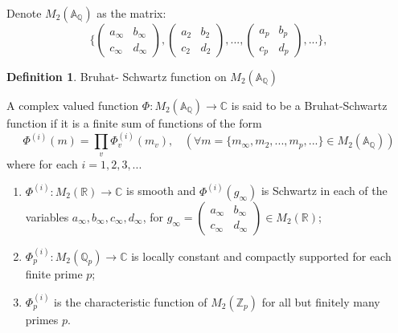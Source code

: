 \documentclass[12pt,a4paper,english]{article}
\theoremstyle{plain}
\theoremstyle{definition}
\newtheorem{defi}{Definition}
\begin{document}
Denote $M_{2}(\mathbb{A}_{\mathbb{Q}})$ as the matrix:
\begin{equation*}
    \bigg\{\begin{pmatrix}
    a_{\infty} &b_{\infty}\\
    c_{\infty} & d_{\infty}
    \end{pmatrix},
    \begin{pmatrix}
a_{2} & b_{2}\\
c_{2} & d_{2}
\end{pmatrix},...,
\begin{pmatrix}
a_{p} & b_{p}\\
c_{p} & d_{p}
\end{pmatrix},...
    \bigg\},
\end{equation*}
\begin{defi}\label{BSA}
    Bruhat- Schwartz function on $M_{2}(\mathbb{A}_{\mathbb{Q}})$
    
    A complex valued function $\Phi:M_{2}(\mathbb{A}_{\mathbb{Q}})\rightarrow\mathbb{C}$ is said to be a Bruhat-Schwartz function if it is a finite sum of functions of the form 
\begin{equation*}
    \Phi^{(i)}(m)=\prod_{v}\Phi^{(i)}_{v}(m_{v}), \ \ \ \ (\forall m=\{m_{\infty},m_{2},...,m_{p},...\}\in M_{2}(\mathbb{A}_{\mathbb{Q}}))
\end{equation*}
where for each $i=1,2,3,...$
\begin{enumerate}
    \item $\Phi^{(i)}:M_{2}(\mathbb{R})\rightarrow \mathbb{C}$ is smooth and $\Phi^{(i)}(g_{\infty})$ is Schwartz in each of the variables $a_{\infty}, b_{\infty}, c_{\infty},d_{\infty}$, for $g_{\infty}=\begin{pmatrix}
    a_{\infty}&b_{\infty}\\
    c_{\infty} &d_{\infty}
    \end{pmatrix}\in M_{2}(\mathbb{R})$;
    \item $\Phi^{(i)}_{p}: M_{2}(\mathbb{Q}_{p})\rightarrow\mathbb{C}$ is locally constant and compactly supported for each finite prime $p$;
    \item $\Phi^{(i)}_{p}$ is the characteristic function of $M_{2}(\mathbb{Z}_{p})$ for all but finitely many primes $p$.
\end{enumerate}
\end{defi}
\end{document}
